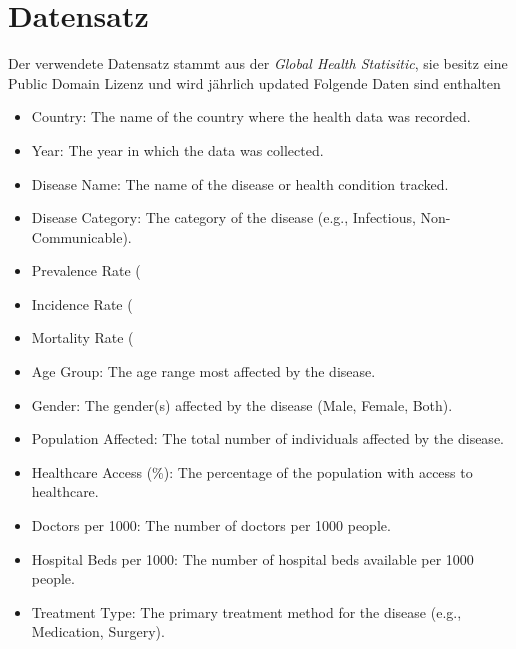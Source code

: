 \documentclass[a4paper,12pt]{article}
\begin{document}
\section{Datensatz}
Der verwendete Datensatz stammt aus der \textit{Global Health Statisitic}, sie besitz eine Public Domain Lizenz und wird jährlich updated\newline
Folgende Daten sind enthalten
\begin{itemize}

\item Country: The name of the country where the health data was recorded.

\item Year: The year in which the data was collected.

\item Disease Name: The name of the disease or health condition tracked.

\item Disease Category: The category of the disease (e.g., Infectious, Non-Communicable).

\item Prevalence Rate (%

\item Incidence Rate (%

\item Mortality Rate (%

\item Age Group: The age range most affected by the disease.

\item Gender: The gender(s) affected by the disease (Male, Female, Both).

\item Population Affected: The total number of individuals affected by the disease.

\item Healthcare Access (\%): The percentage of the population with access to healthcare.

\item Doctors per 1000: The number of doctors per 1000 people.

\item Hospital Beds per 1000: The number of hospital beds available per 1000 people.

\item Treatment Type: The primary treatment method for the disease (e.g., Medication, Surgery).


\end{itemize}
\end{document}
